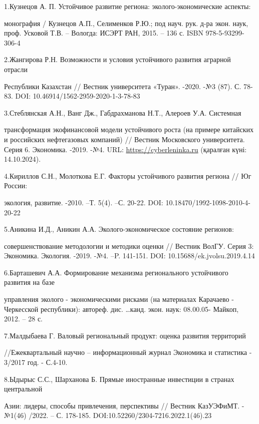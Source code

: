 \begin{noparindent}
1.Кузнецов А. П. Устойчивое развитие региона: эколого-экономические
аспекты:

монография / Кузнецов А.П., Селименков Р.Ю.; под науч. рук. д-ра экон.
наук, проф. Усковой Т.В. -- Вологда: ИСЭРТ РАН, 2015. -- 136 с. ISBN
978-5-93299-306-4

2.Жангирова Р.Н. Возможности и условия устойчивого развития аграрной
отрасли

Республики Казахстан // Вестник университета «Туран». -2020. -№3 (87).
С. 78-83. DOI: 10.46914/1562-2959-2020-1-3-78-83

3.Стеблянская А.Н., Ванг Дж., Габдрахманова Н.Т., Алероев У.А. Системная

трансформация экофинансовой модели устойчивого роста (на примере
китайских и российских нефтегазовых компаний) // Вестник Московского
университета. Серия 6. Экономика. -2019. -№4. URL:
\href{https://cyberleninka.ru/article/n/sistemnaya-transformatsiya-ekofinansovoy-modeli-ustoychivogo-rosta-na-primere-kitayskih-i-rossiyskih-neftegazovyh-kompaniy}{https://cyberleninka.ru}
(қаралған күні: 14.10.2024).

4.Кириллов С.Н., Молоткова Е.Г. Факторы устойчивого развития региона //
Юг России:

экология, развитие. -2010. --Т. 5(4). --С. 20-22. DOI:
10.18470/1992-1098-2010-4-20-22

5.Аникина И.Д., Аникин А.А. Эколого-экономическое состояние регионов:

совершенствование методологии и методики оценки // Вестник ВолГУ. Серия
3: Экономика. Экология. -2019. -№4. --P. 141-151. DOI:
10.15688/ek.jvolsu.2019.4.14

6.Барташевич А.А. Формирование механизма регионального устойчивого
развития на базе

управления эколого - экономическими рисками (на материалах Карачаево -
Черкесской республики): автореф. дис. \ldots канд. экон. наук: 08.00.05-
Майкоп, 2012. -- 28 с.

7.Малдыбаева Г. Валовый региональный продукт: оценка развития территорий

//Ежеквартальный научно -- информационный журнал Экономика и статистика
- 3/2017 год. - С.4-10.

8.Ыдырыс С.С., Шарханова Б. Прямые иностранные инвестиции в странах
центральной

Азии: лидеры, способы привлечения, перспективы // Вестник КазУЭФиМТ.
-№1(46) /2022. -- С. 178-185. DOI:10.52260/2304-7216.2022.1(46).23


\end{noparindent}
